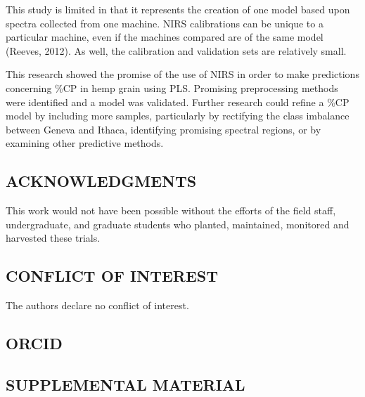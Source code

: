 \documentclass[
]{agujournal2019}
\begin{document}
This study is limited in that it represents the creation of one model
based upon spectra collected from one machine. NIRS calibrations can be
unique to a particular machine, even if the machines compared are of the
same model (Reeves, 2012). As well, the calibration and validation sets
are relatively small.

This research showed the promise of the use of NIRS in order to make
predictions concerning \%CP in hemp grain using PLS. Promising
preprocessing methods were identified and a model was validated. Further
research could refine a \%CP model by including more samples,
particularly by rectifying the class imbalance between Geneva and
Ithaca, identifying promising spectral regions, or by examining other
predictive methods.

\subsection{ACKNOWLEDGMENTS}\label{acknowledgments}

This work would not have been possible without the efforts of the field
staff, undergraduate, and graduate students who planted, maintained,
monitored and harvested these trials.

\subsection{CONFLICT OF INTEREST}\label{conflict-of-interest}

The authors declare no conflict of interest.

\subsection{ORCID}\label{orcid}

\subsection{SUPPLEMENTAL MATERIAL}\label{supplemental-material}
\end{document}
